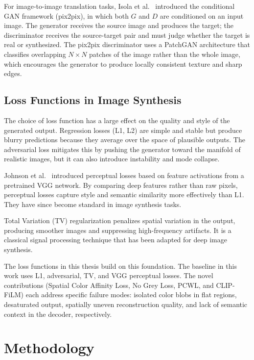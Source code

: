 \documentclass[12pt, a4paper, oneside]{report}
\begin{document}
For image-to-image translation tasks, Isola et al.\ \cite{isola2017image} introduced
the conditional GAN framework (pix2pix), in which both $G$ and $D$ are conditioned
on an input image. The generator receives the source image and produces the target;
the discriminator receives the source-target pair and must judge whether the target
is real or synthesized. The pix2pix discriminator uses a PatchGAN architecture that
classifies overlapping $N \times N$ patches of the image rather than the whole image,
which encourages the generator to produce locally consistent texture and sharp edges.

\section{Loss Functions in Image Synthesis}

The choice of loss function has a large effect on the quality and style of the
generated output. Regression losses (L1, L2) are simple and stable but produce
blurry predictions because they average over the space of plausible outputs. The
adversarial loss mitigates this by pushing the generator toward the manifold of
realistic images, but it can also introduce instability and mode collapse.

Johnson et al.\ \cite{johnson2016perceptual} introduced perceptual losses based
on feature activations from a pretrained VGG network. By comparing deep features
rather than raw pixels, perceptual losses capture style and semantic similarity
more effectively than L1. They have since become standard in image synthesis tasks.

Total Variation (TV) regularization penalizes spatial variation in the output,
producing smoother images and suppressing high-frequency artifacts. It is a classical
signal processing technique that has been adapted for deep image synthesis.

The loss functions in this thesis build on this foundation. The baseline in this
work uses L1, adversarial, TV, and VGG perceptual losses. The novel contributions
(Spatial Color Affinity Loss, No Grey Loss, PCWL, and CLIP-FiLM) each address
specific failure modes: isolated color blobs in flat regions, desaturated output,
spatially uneven reconstruction quality, and lack of semantic context in the
decoder, respectively.


\chapter{Methodology}
\label{ch:methodology}
\end{document}
